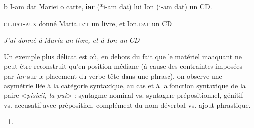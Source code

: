  b  I-am dat Mariei o carte, \textbf{iar} (*i-am dat) lui Ion (i-am dat) un CD.

    \textsc{cl.dat-aux} donné Maria.\textsc{dat} un livre, et Ion.\textsc{dat} un CD

{\itshape
J'ai donné à Maria un livre, et à Ion un CD}

Un exemple plus délicat est  où, en dehors du fait que le matériel manquant ne peut être reconstruit qu'en position médiane (à cause des contraintes imposées par \textit{iar} sur le placement du verbe tête dans une phrase), on observe une asymétrie liée à la catégorie syntaxique, au cas et à la fonction syntaxique de la paire {\textless}\textit{pisicii, la pui}{\textgreater} : syntagme nominal vs. syntagme prépositionnel, génitif vs. accusatif avec préposition, complément du nom déverbal vs. ajout phrastique.


\begin{enumerate}
\item \label{bkm:Ref302393291}\textstylestandard{}  


\end{enumerate}

